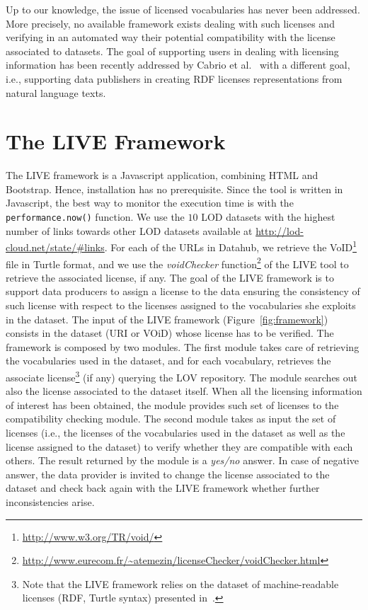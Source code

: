 Up to our knowledge, the issue of licensed vocabularies has never been addressed. More precisely, no available framework exists dealing with such licenses and verifying in an automated way their potential compatibility with the license associated to datasets. The goal of supporting users in dealing with licensing information has been recently addressed by Cabrio et al.~\cite{CabrioESWC2014} with a different goal, i.e., supporting data publishers in creating RDF licenses representations from natural language texts.

\section{The LIVE Framework}
\label{sec:live}
The LIVE framework is a Javascript application, combining HTML and Bootstrap. Hence, installation has no prerequisite. Since the tool is written in Javascript, the best way to monitor the execution time is with the \texttt{performance.now()} function. We use the $10$ LOD datasets with the highest number of links towards other LOD datasets available at \url{http://lod-cloud.net/state/#links}. For each of the URLs in Datahub, we retrieve the VoID\footnote{\url{http://www.w3.org/TR/void/}} file in Turtle format, and we use the \textit{voidChecker} function\footnote{\url{http://www.eurecom.fr/~atemezin/licenseChecker/voidChecker.html}} of the LIVE tool to retrieve the associated license, if any.
The goal of the LIVE framework is to support data producers to assign a license to the data ensuring the consistency of such license with respect to the licenses assigned to the vocabularies she exploits in the dataset.
The input of the LIVE framework (Figure~\ref{fig:framework}) consists in the dataset (URI or VOiD) whose license has to be verified. The framework is composed by two modules. The first module takes care of retrieving the vocabularies used in the dataset, and for each vocabulary, retrieves the associate license\footnote{Note that the LIVE framework relies on the dataset of machine-readable licenses (RDF, Turtle syntax) presented in~\cite{CabrioESWC2014}.} (if any) querying the LOV repository.
The module searches out also the license associated to the dataset itself. When all the licensing information of interest has been obtained, the module provides such set of licenses to the compatibility checking module.
The second module takes as input the set of licenses (i.e., the licenses of the vocabularies used in the dataset as well as the license assigned to the dataset) to verify whether they are compatible with each others. The result returned by the module is a \textit{yes/no} answer. In case of negative answer, the data provider is invited to change the license associated to the dataset and check back again with the LIVE framework whether further inconsistencies arise.

